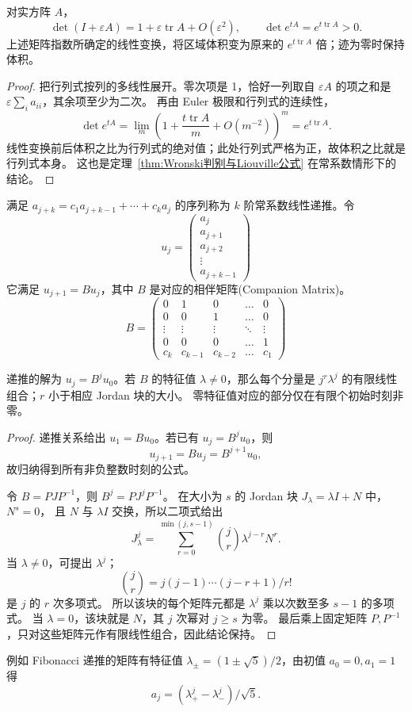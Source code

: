 \begin{proposition}[迹与体积]
对实方阵 $A$，
\[
 \det(I+\varepsilon A)=1+\varepsilon\operatorname{tr}A+O(\varepsilon^2),
 \qquad \det e^{tA}=e^{t\operatorname{tr}A}>0.
\]
上述矩阵指数所确定的线性变换，将区域体积变为原来的 $e^{t\operatorname{tr}A}$ 倍；迹为零时保持体积。
\end{proposition}
\begin{proof}
把行列式按列的多线性展开。零次项是 1，恰好一列取自
$\varepsilon A$ 的项之和是 $\varepsilon\sum_i a_{ii}$，其余项至少为二次。
再由 Euler 极限和行列式的连续性，
\[
 \det e^{tA}=\lim_m
 \left(1+\frac{t\operatorname{tr}A}{m}+O(m^{-2})\right)^m
 =e^{t\operatorname{tr}A}.
\]
线性变换前后体积之比为行列式的绝对值；此处行列式严格为正，故体积之比就是行列式本身。
这也是定理~\ref{thm:Wronski判别与Liouville公式} 在常系数情形下的结论。
\end{proof}

\begin{definition}[常系数线性递推]
满足 $a_{j+k}=c_1a_{j+k-1}+\cdots+c_ka_j$ 的序列称为 $k$ 阶常系数线性递推。令
$$u_j = \begin{pmatrix} a_j \\ a_{j+1} \\ a_{j+2} \\ \vdots \\ a_{j+k-1} \end{pmatrix}$$
它满足 $u_{j+1}=Bu_j$，其中 $B$ 是对应的相伴矩阵(Companion Matrix)。
\[B = \begin{pmatrix} 
	0 & 1 & 0 & \dots & 0 \\ 
	0 & 0 & 1 & \dots & 0 \\ 
	\vdots & \vdots & \vdots & \ddots & \vdots \\
	0 & 0 & 0 & \dots & 1 \\ 
	c_k & c_{k-1} & c_{k-2} & \dots & c_1 \end{pmatrix}\]
\end{definition}
\begin{proposition}
递推的解为 $u_j=B^ju_0$。若 $B$ 的特征值 $\lambda \neq 0$，那么每个分量是
$j^r\lambda^j$ 的有限线性组合；$r$ 小于相应 Jordan 块的大小。
零特征值对应的部分仅在有限个初始时刻非零。
\end{proposition}
\begin{proof}
递推关系给出 $u_1=Bu_0$。若已有 $u_j=B^ju_0$，则
\[
 u_{j+1}=Bu_j=B^{j+1}u_0,
\]
故归纳得到所有非负整数时刻的公式。

令 $B=PJP^{-1}$，则 $B^j=PJ^jP^{-1}$。
在大小为 $s$ 的 Jordan 块 $J_\lambda=\lambda I+N$ 中，$N^s=0$，
且 $N$ 与 $\lambda I$ 交换，所以二项式给出
\[
 J_\lambda^j=\sum_{r=0}^{\min(j,s-1)}\binom jr\lambda^{j-r}N^r.
\]
当 $\lambda\ne0$，可提出 $\lambda^j$；
\[
 \binom jr=j(j-1)\cdots(j-r+1)/r!
\]
 是 $j$ 的 $r$ 次多项式。
所以该块的每个矩阵元都是 $\lambda^j$ 乘以次数至多 $s-1$ 的多项式。
当 $\lambda=0$，该块就是 $N$，其 $j$ 次幂对 $j\geq s$ 为零。
最后乘上固定矩阵 $P,P^{-1}$，只对这些矩阵元作有限线性组合，因此结论保持。
\end{proof}
例如 Fibonacci 递推的矩阵有特征值
$\lambda_\pm=(1\pm\sqrt5)/2$，由初值 $a_0=0,a_1=1$ 得
\[
 a_j=(\lambda_+^j-\lambda_-^j)/\sqrt5.
\]
